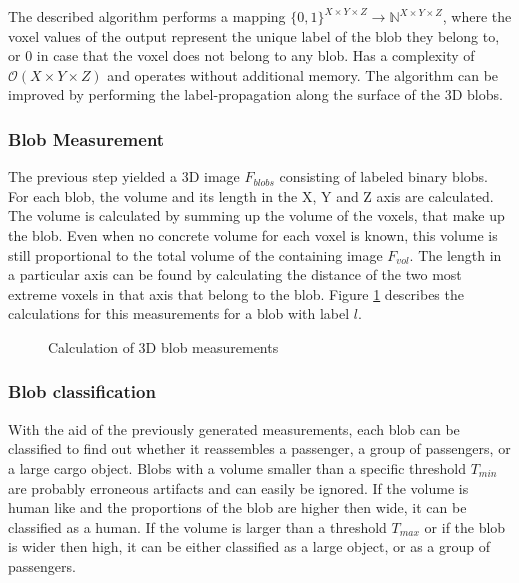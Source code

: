 The described algorithm performs a mapping $ \{0, 1\}^{X \times Y \times Z} \rightarrow \mathbb{N}^{X \times Y \times Z} $, where the voxel values of the output represent the unique label of the blob they belong to, or 0 in case that the voxel does not belong to any blob.
Has a complexity of $ \mathcal{O}(X \times Y \times Z) $ and operates without additional memory. 
The algorithm can be improved by performing the label-propagation along the surface of the \ac{3D} blobs.

\subsubsection{Blob Measurement}

The previous step yielded a \ac{3D} image $ F_{blobs} $ consisting of labeled binary blobs.
For each blob, the volume and its length in the X, Y and Z axis are calculated.
The volume is calculated by summing up the volume of the voxels, that make up the blob.
Even when no concrete volume for each voxel is known, this volume is still proportional to the total volume of the containing image $ F_{vol} $.
The length in a particular axis can be found  by calculating the distance of the two most extreme voxels in that axis that belong to the blob.
Figure \ref{fig:design:blobmeasurement} describes the calculations for this measurements for a blob with label $ l $.

\begin{figure}[h!]
\caption{Calculation of 3D blob measurements}
\label{fig:design:blobmeasurement}
\end{figure}

\subsubsection{Blob classification}
With the aid of the previously generated measurements, each blob can be classified to find out whether it reassembles a passenger, a group of passengers, or a large cargo object.
Blobs with a volume smaller than a specific threshold $ T_{min} $ are probably erroneous artifacts and can easily be ignored.
If the volume is human like and the proportions of the blob are higher then wide, it can be classified as a human. 
If the volume is larger than a threshold $ T_{max} $ or if the blob is wider then high, it can be either classified as a large object, or as a group of passengers.

